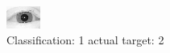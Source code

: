 \begin{figure}[h!]
\begin{center}
\includegraphics[width=0.60\columnwidth]{figures/ID3089_class_1_target_2.png}
\end{center}
\caption{ Classification: 1 actual target: 2}
\label{fig:ID3089_class_1_target_2}
\end{figure}
